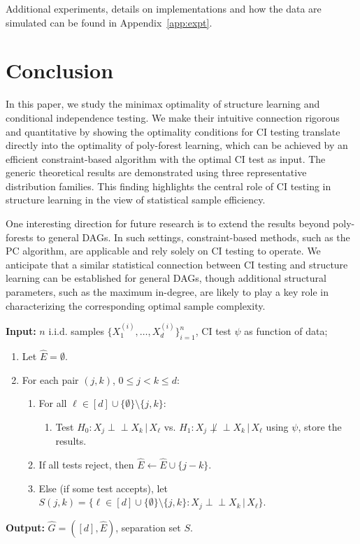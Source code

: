 \documentclass{article}
\theoremstyle{definition}
\theoremstyle{definition}
\theoremstyle{definition}
\theoremstyle{definition}
\theoremstyle{definition}
\theoremstyle{definition}
\theoremstyle{remark}
\theoremstyle{remark}
\newcommand{\given}{\,|\,}
\newcommand{\indep}{\perp \!\!\! \perp }
\begin{document}
Additional experiments, details on implementations and how the data are simulated can be found in Appendix~\ref{app:expt}.




\section{Conclusion}\label{sec:concl}
In this paper, we study the minimax optimality of structure learning and conditional independence testing. 
We make their intuitive connection rigorous and quantitative
by showing the optimality conditions for CI testing translate directly into the optimality of poly-forest learning, which can be achieved by an efficient constraint-based algorithm with the optimal CI test as input. 
The generic theoretical results are demonstrated using three representative distribution families. This finding highlights the central role of CI testing in structure learning in the view of statistical sample efficiency.

One interesting direction for future research is to extend the results beyond poly-forests to general DAGs. In such settings, constraint-based methods, such as the PC algorithm, are applicable and rely solely on CI testing to operate. We anticipate that a similar statistical connection between CI testing and structure learning can be established for general DAGs, though additional structural parameters, such as the maximum in-degree, are likely to play a key role in characterizing the corresponding optimal sample complexity.

\clearpage


\appendix


\begin{algorithm}[h]
\caption{\texttt{PC-Tree} algorithm}\label{alg:tree}
\textbf{Input:} $n$ i.i.d. samples $\{X^{(i)}_1,\ldots,X^{(i)}_d\}_{i=1}^n$, CI test $\psi$ as function of data;
\begin{enumerate}
    \item Let $\widehat{E} = \emptyset$.
    \item For each pair $(j,k)$, $0\le j < k \le d$:
    \begin{enumerate}
        \item For all $\ell \in [d]\cup\{\emptyset\}\setminus \{j,k\}$:
        \begin{enumerate}
            \item Test $H_0:X_j\indep X_k\given X_\ell$ vs. $H_1:X_j\not\indep X_k\given X_\ell$ using $\psi$, store the results.
        \end{enumerate}
        \item If all tests reject, then $\widehat{E}\leftarrow \widehat{E}\cup \{j-k\}$.
        \item Else (if some test accepts), let $S(j,k) = \{\ell\in [d]\cup\{\emptyset\}\setminus \{j,k\}: X_j \indep X_k\given X_\ell\}$.
    \end{enumerate}
\end{enumerate}
\textbf{Output:} $\widehat{G}= ([d],\widehat{E})$, separation set $S$.
\end{algorithm}
\end{document}
